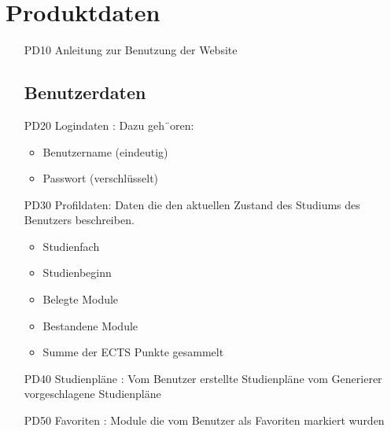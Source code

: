 \section{Produktdaten}
\begin{itemize}[nosep]
\subsection{Systemdaten}
\item[PD10]Anleitung zur Benutzung der Website
\subsection{Benutzerdaten}
\item[PD20]Logindaten : Dazu geh¨oren:
\begin{itemize}
\item Benutzername (eindeutig)
\item Passwort (verschlüsselt)
\end{itemize}
\item[PD30]Profildaten: Daten die den aktuellen Zustand des Studiums des Benutzers beschreiben.
\begin{itemize}
\item Studienfach
\item Studienbeginn
\item Belegte Module
\item Bestandene Module 
\item Summe der ECTS Punkte gesammelt
\end{itemize}

\item[PD40]Studienpläne : 
	Vom Benutzer erstellte Studienpläne 
	vom Generierer vorgeschlagene Studienpläne 
\item[PD50] Favoriten : Module die vom Benutzer als Favoriten markiert wurden
\end{itemize}